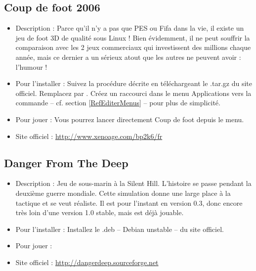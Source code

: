 \subsection{Coup de foot 2006}
\begin{itemize}
\begingroup
{}
\item Description : Parce qu'il n'y a pas que PES ou Fifa dans la vie, il existe un jeu  de foot 3D de qualité sous Linux ! Bien évidemment, il ne peut souffrir la comparaison avec les 2 jeux commerciaux qui investissent des millions chaque année, mais ce dernier a un sérieux atout que les autres ne peuvent avoir : l'humour !{\par}
\endgroup
\item Pour l'installer : Suivez la procédure décrite en téléchargeant le .tar.gz du site officiel. Remplacez  par . Créez un raccourci dans le menu Applications vers la commande  -- cf. section \ref{RefEditerMenus} -- pour plus de simplicité.{\par}
\item Pour jouer : Vous pourrez lancer directement Coup de foot depuis le menu.{\par}
\item Site officiel : \url{http://www.xenoage.com/bp2k6/fr}{\par}
\end{itemize}
\subsection{Danger From The Deep}
\begin{itemize}
\begingroup
{}
\item Description : Jeu de sous-marin à la Silent Hill. L'histoire se passe pendant la deuxième guerre mondiale. Cette simulation donne une large place à la tactique et se veut réaliste. Il est pour l'instant en version 0.3, donc encore très loin d'une version 1.0 stable, mais est déjà jouable.{\par}
\endgroup
\item Pour l'installer : Installez le .deb -- Debian unstable -- du site officiel.{\par}
\item Pour jouer : 
\item Site officiel : \url{http://dangerdeep.sourceforge.net}{\par}
\end{itemize}
